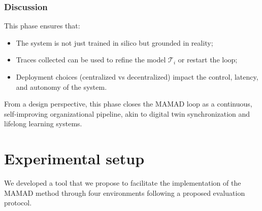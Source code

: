 \documentclass[pdflatex,sn-mathphys-num]{sn-jnl}%
\theoremstyle{thmstyleone}%
\theoremstyle{thmstyletwo}%
\theoremstyle{thmstylethree}%
\begin{document}
\subsubsection*{Discussion}

This phase ensures that:

\begin{itemize}
    \item The system is not just trained in silico but grounded in reality;
    \item Traces collected can be used to refine the model $\mathcal{T}_i$ or restart the loop;
    \item Deployment choices (centralized vs decentralized) impact the control, latency, and autonomy of the system.
\end{itemize}

From a design perspective, this phase closes the MAMAD loop as a continuous, self-improving organizational pipeline, akin to digital twin synchronization and lifelong learning systems.




\section{Experimental setup}
\label{sec:experimental_setup}

We developed a tool that we propose to facilitate the implementation of the MAMAD method through four environments following a proposed evaluation protocol.




\end{document}
